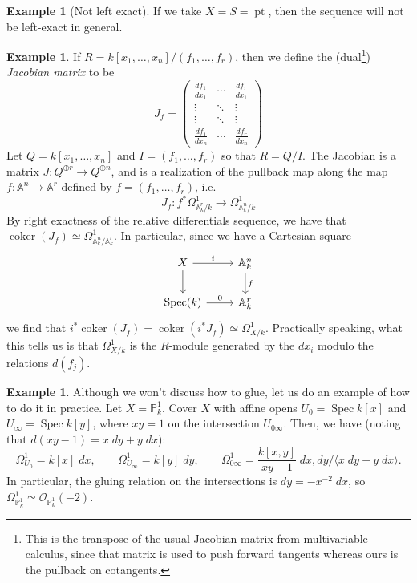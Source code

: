 \documentclass[10pt]{article}
\theoremstyle{definition}
\newtheorem{exmp}[thm]{Example}
\DeclareMathOperator{\Spec}{Spec}
\DeclareMathOperator{\pt}{pt}
\DeclareMathOperator{\coker}{coker}
\newcommand{\OO}{\mathcal{O}}
\newcommand{\todo}[1]{\textbf{\textcolor{red}{TODO #1}}}
\begin{document}
\begin{exmp}[Not left exact]
If we take $X = S = \pt$, then the sequence will not be left-exact in general.
\end{exmp}



\begin{exmp}
If $R = k[x_1, \ldots, x_n]/(f_1, \ldots, f_r)$, then we define the (dual\footnote{This is the transpose of the usual Jacobian matrix from multivariable calculus, since that matrix is used to push forward tangents whereas ours is the pullback on cotangents.}) \emph{Jacobian matrix} to be
$$J_f = \begin{pmatrix} \frac{df_1}{dx_1} & \cdots & \frac{df_r}{dx_1} \\ 
\vdots & \ddots & \vdots \\
\vdots & \ddots & \vdots \\
 \frac{df_1}{dx_n} & \cdots & \frac{df_r}{dx_n} \end{pmatrix}$$
Let $Q = k[x_1, \ldots, x_n]$ and $I = (f_1, \ldots, f_r)$ so that $R = Q/I$.  The Jacobian is a matrix $J: Q^{\oplus r} \rightarrow Q^{\oplus n}$, and is a realization of the pullback map along the map $f: \mathbb{A}^n \rightarrow \mathbb{A}^r$ defined by $f = (f_1, \ldots, f_r)$, i.e.
$$J_f: f^* \Omega^1_{\mathbb{A}^r_k/k} \rightarrow \Omega^1_{\mathbb{A}^n_k/k}$$
By right exactness of the relative differentials sequence, we have that $\coker(J_f) \simeq \Omega^1_{\mathbb{A}^n_k/\mathbb{A}^r_k}$.  In particular, since we have a Cartesian square
$$\begin{tikzcd}
X \arrow[r, "i"] \arrow[d] & \mathbb{A}^n_k \arrow[d, "f"] \\
\Spec(k) \arrow[r, "0"] & \mathbb{A}^r_k
\end{tikzcd}$$
we find that $i^*\coker(J_f) = \coker(i^* J_f) \simeq \Omega^1_{X/k}$.  Practically speaking, what this tells us is that $\Omega^1_{X/k}$ is the $R$-module generated by the $dx_i$ modulo the relations $d(f_j)$.
\end{exmp}



\begin{exmp}
Although we won't discuss how to glue, let us do an example of how to do it in practice.  Let $X = \mathbb{P}^1_k$.  Cover $X$ with affine opens $U_0 = \Spec k[x]$ and $U_\infty = \Spec k[y]$, where $xy = 1$ on the intersection $U_{0\infty}$.  Then, we have (noting that $d(xy - 1) = x\;dy + y\;dx$):
$$\Omega^1_{U_0} = k[x] \; dx, \;\;\;\;\;\;\; \Omega^1_{U_\infty} = k[y] \; dy, \;\;\;\;\;\;\; \Omega^1_{0\infty} = \frac{k[x,y]}{xy-1} \; dx, dy / \langle x\; dy + y \;dx \rangle.$$
In particular, the gluing relation on the intersections is $dy = -x^{-2} \; dx$, so $\Omega^1_{\mathbb{P}^1_k} \simeq \OO_{\mathbb{P}^1_k}(-2)$.
\end{exmp}
\end{document}

